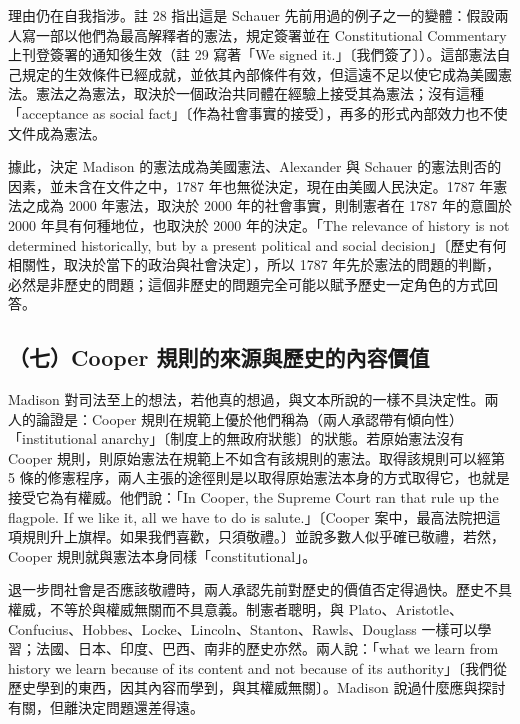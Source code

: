 理由仍在自我指涉。註 28 指出這是 Schauer 先前用過的例子之一的變體：假設兩人寫一部以他們為最高解釋者的憲法，規定簽署並在 Constitutional Commentary 上刊登簽署的通知後生效（註 29 寫著「We signed it.」〔我們簽了〕）。這部憲法自己規定的生效條件已經成就，並依其內部條件有效，但這遠不足以使它成為美國憲法。憲法之為憲法，取決於一個政治共同體在經驗上接受其為憲法；沒有這種「acceptance as social fact」〔作為社會事實的接受〕，再多的形式內部效力也不使文件成為憲法。

據此，決定 Madison 的憲法成為美國憲法、Alexander 與 Schauer 的憲法則否的因素，並未含在文件之中，1787 年也無從決定，現在由美國人民決定。1787 年憲法之成為 2000 年憲法，取決於 2000 年的社會事實，則制憲者在 1787 年的意圖於 2000 年具有何種地位，也取決於 2000 年的決定。「The relevance of history is not determined historically, but by a present political and social decision」〔歷史有何相關性，取決於當下的政治與社會決定〕，所以 1787 年先於憲法的問題的判斷，必然是非歷史的問題；這個非歷史的問題完全可能以賦予歷史一定角色的方式回答。

\subsection{（七）Cooper 規則的來源與歷史的內容價值}

Madison 對司法至上的想法，若他真的想過，與文本所說的一樣不具決定性。兩人的論證是：Cooper 規則在規範上優於他們稱為（兩人承認帶有傾向性）「institutional anarchy」〔制度上的無政府狀態〕的狀態。若原始憲法沒有 Cooper 規則，則原始憲法在規範上不如含有該規則的憲法。取得該規則可以經第 5 條的修憲程序，兩人主張的途徑則是以取得原始憲法本身的方式取得它，也就是接受它為有權威。他們說：「In Cooper, the Supreme Court ran that rule up the flagpole. If we like it, all we have to do is salute.」〔Cooper 案中，最高法院把這項規則升上旗桿。如果我們喜歡，只須敬禮。〕並說多數人似乎確已敬禮，若然，Cooper 規則就與憲法本身同樣「constitutional」。

退一步問社會是否應該敬禮時，兩人承認先前對歷史的價值否定得過快。歷史不具權威，不等於與權威無關而不具意義。制憲者聰明，與 Plato、Aristotle、Confucius、Hobbes、Locke、Lincoln、Stanton、Rawls、Douglass 一樣可以學習；法國、日本、印度、巴西、南非的歷史亦然。兩人說：「what we learn from history we learn because of its content and not because of its authority」〔我們從歷史學到的東西，因其內容而學到，與其權威無關〕。Madison 說過什麼應與探討有關，但離決定問題還差得遠。

